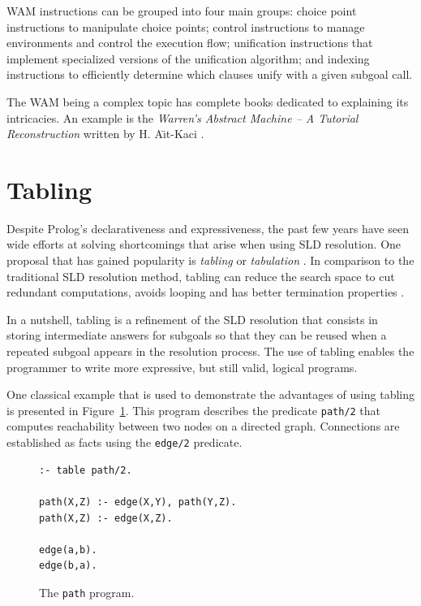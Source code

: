 WAM instructions can be grouped into four main groups: choice point instructions to manipulate choice points; control
instructions to manage environments and control the execution flow; unification instructions that implement
specialized versions of the unification algorithm; and indexing instructions to efficiently determine which clauses
unify with a given subgoal call.

The WAM being a complex topic has complete books dedicated to explaining its intricacies.
An example is the \textit{Warren's Abstract Machine -- A Tutorial Reconstruction} written by H. A\"{\i}t-Kaci \cite{Aitkaci-91}. 

\section{Tabling}

Despite Prolog's declarativeness and expressiveness, the past few years have seen wide efforts at
solving shortcomings that arise when using SLD resolution.
One proposal that has gained popularity is \textit{tabling} or \textit{tabulation} \cite{Chen-96}.
In comparison to the traditional SLD resolution method, tabling can reduce the search space to cut redundant computations,
avoids looping and has better termination properties \cite{Tamaki-86}.

In a nutshell, tabling is a refinement of the SLD resolution that consists in storing intermediate answers for
subgoals so that they can be reused when a repeated subgoal appears in the resolution process.
The use of tabling enables the programmer to write more expressive, but still valid, logical programs.

One classical example that is used to demonstrate the advantages of using tabling is presented
in Figure~\ref{fig:prolog_path}. This program describes the predicate \texttt{path/2} that computes
reachability between two nodes on a directed graph. Connections are established as facts using the
\texttt{edge/2} predicate.

\begin{figure}[ht]
\begin{verbatim}
:- table path/2.

path(X,Z) :- edge(X,Y), path(Y,Z).
path(X,Z) :- edge(X,Z).

edge(a,b).
edge(b,a).
\end{verbatim}
\caption{The \texttt{path} program.}
\label{fig:prolog_path}
\end{figure}

